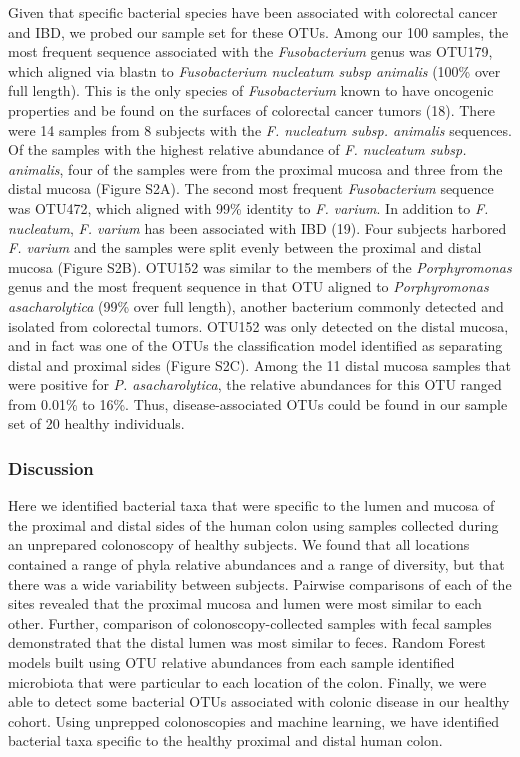 \documentclass[12pt,]{article}
\begin{document}
Given that specific bacterial species have been associated with
colorectal cancer and IBD, we probed our sample set for these OTUs.
Among our 100 samples, the most frequent sequence associated with the
\emph{Fusobacterium} genus was OTU179, which aligned via blastn to
\emph{Fusobacterium nucleatum subsp animalis} (100\% over full length).
This is the only species of \emph{Fusobacterium} known to have oncogenic
properties and be found on the surfaces of colorectal cancer tumors
(18). There were 14 samples from 8 subjects with the \emph{F. nucleatum
subsp. animalis} sequences. Of the samples with the highest relative
abundance of \emph{F. nucleatum subsp. animalis}, four of the samples
were from the proximal mucosa and three from the distal mucosa (Figure
S2A). The second most frequent \emph{Fusobacterium} sequence was OTU472,
which aligned with 99\% identity to \emph{F. varium}. In addition to
\emph{F. nucleatum}, \emph{F. varium} has been associated with IBD (19).
Four subjects harbored \emph{F. varium} and the samples were split
evenly between the proximal and distal mucosa (Figure S2B). OTU152 was
similar to the members of the \emph{Porphyromonas} genus and the most
frequent sequence in that OTU aligned to \emph{Porphyromonas
asacharolytica} (99\% over full length), another bacterium commonly
detected and isolated from colorectal tumors. OTU152 was only detected
on the distal mucosa, and in fact was one of the OTUs the classification
model identified as separating distal and proximal sides (Figure S2C).
Among the 11 distal mucosa samples that were positive for \emph{P.
asacharolytica}, the relative abundances for this OTU ranged from 0.01\%
to 16\%. Thus, disease-associated OTUs could be found in our sample set
of 20 healthy individuals.

\subsubsection{Discussion}\label{discussion}

Here we identified bacterial taxa that were specific to the lumen and
mucosa of the proximal and distal sides of the human colon using samples
collected during an unprepared colonoscopy of healthy subjects. We found
that all locations contained a range of phyla relative abundances and a
range of diversity, but that there was a wide variability between
subjects. Pairwise comparisons of each of the sites revealed that the
proximal mucosa and lumen were most similar to each other. Further,
comparison of colonoscopy-collected samples with fecal samples
demonstrated that the distal lumen was most similar to feces. Random
Forest models built using OTU relative abundances from each sample
identified microbiota that were particular to each location of the
colon. Finally, we were able to detect some bacterial OTUs associated
with colonic disease in our healthy cohort. Using unprepped
colonoscopies and machine learning, we have identified bacterial taxa
specific to the healthy proximal and distal human colon.
\end{document}
